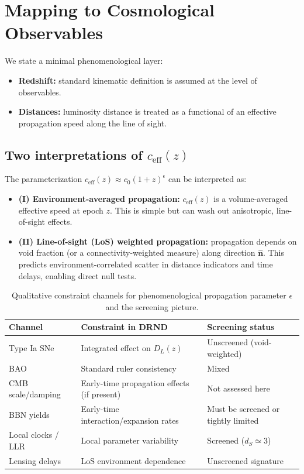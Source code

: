 \documentclass[12pt]{iopart}
\begin{document}
\section{Mapping to Cosmological Observables}
\label{sec:observables}

We state a minimal phenomenological layer:
\begin{itemize}
    \item \textbf{Redshift:} standard kinematic definition is assumed at the level of observables.
    \item \textbf{Distances:} luminosity distance is treated as a functional of an effective propagation speed along the line of sight.
\end{itemize}

\subsection{Two interpretations of \texorpdfstring{$c_{\mathrm{eff}}(z)$}{ceff(z)}}
The parameterization $c_{\mathrm{eff}}(z)\approx c_0(1+z)^\epsilon$ can be interpreted as:

\begin{itemize}
\item \textbf{(I) Environment-averaged propagation:} $c_{\mathrm{eff}}(z)$ is a volume-averaged effective speed at epoch $z$. This is simple but can wash out anisotropic, line-of-sight effects.
\item \textbf{(II) Line-of-sight (LoS) weighted propagation:} propagation depends on void fraction (or a connectivity-weighted measure) along direction $\hat{\mathbf{n}}$. This predicts environment-correlated scatter in distance indicators and time delays, enabling direct null tests.
\end{itemize}

\begin{table}[htbp]
\caption{Qualitative constraint channels for phenomenological propagation parameter $\epsilon$ and the screening picture.}
\label{tab:constraints_screening}
\begin{center}
\small
\raggedright
\begin{tabular}{p{} p{} p{}}
\hline
\textbf{Channel} & \textbf{Constraint in DRND} & \textbf{Screening status} \\
\hline
Type Ia SNe & Integrated effect on $D_L(z)$ & Unscreened (void-weighted) \\
BAO & Standard ruler consistency & Mixed \\
CMB scale/damping & Early-time propagation effects (if present) & Not assessed here \\
BBN yields & Early-time interaction/expansion rates & Must be screened or tightly limited \\
Local clocks / LLR & Local parameter variability & Screened ($d_S \simeq 3$) \\
Lensing delays & LoS environment dependence & Unscreened signature \\
\hline
\end{tabular}
\end{center}
\end{table}
\end{document}
